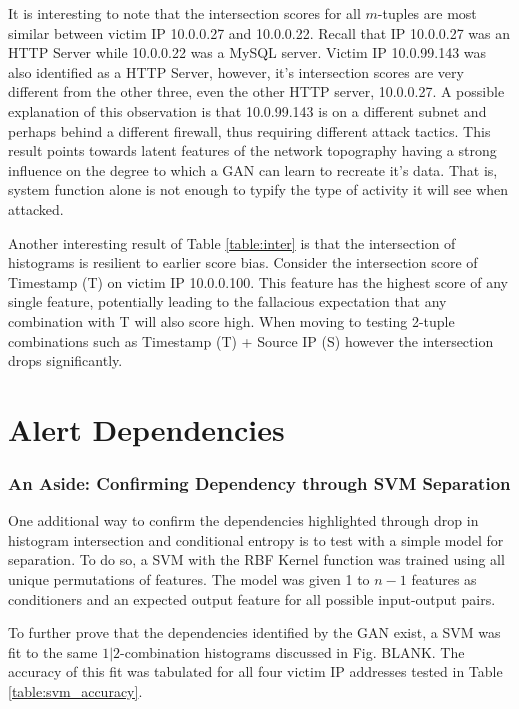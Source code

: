 It is interesting to note that the intersection scores for all $m$-tuples are most similar between victim IP 10.0.0.27 and 10.0.0.22. Recall that IP 10.0.0.27 was an HTTP Server while 10.0.0.22 was a MySQL server. Victim IP 10.0.99.143 was also identified as a HTTP Server, however, it's intersection scores are very different from the other three, even the other HTTP server, 10.0.0.27. A possible explanation of this observation is that 10.0.99.143 is on a different subnet and perhaps behind a different firewall, thus requiring different attack tactics. This result points towards latent features of the network topography having a strong influence on the degree to which a GAN can learn to recreate it's data. That is, system function alone is not enough to typify the type of activity it will see when attacked.

Another interesting result of Table \ref{table:inter} is that the intersection of histograms is resilient to earlier score bias. Consider the intersection score of Timestamp (T) on victim IP 10.0.0.100. This feature has the highest score of any single feature, potentially leading to the fallacious expectation that any combination with T will also score high. When moving to testing 2-tuple combinations such as Timestamp (T) + Source IP (S) however the intersection drops significantly.

\section{Alert Dependencies}
\label{sec:depend}



\subsubsection{An Aside: Confirming Dependency through SVM Separation}

One additional way to confirm the dependencies highlighted through drop in histogram intersection and conditional entropy is to test with a simple model for separation. To do so, a SVM with the RBF Kernel function was trained using all unique permutations of features. The model was given 1 to $n-1$ features as conditioners and an expected output feature for all possible input-output pairs. 

To further prove that the dependencies identified by the GAN exist, a SVM was fit to the same $1|2$-combination histograms discussed in Fig. BLANK. The accuracy of this fit was tabulated for all four victim IP addresses tested in Table \ref{table:svm_accuracy}.

